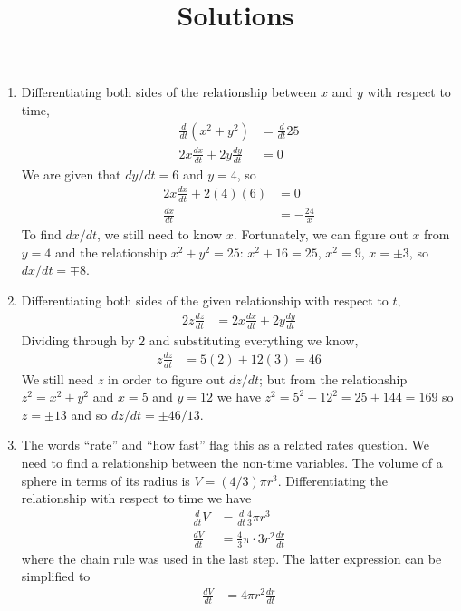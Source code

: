 \documentclass{article}
\title{\commonPSTitleZeroTwoEight\ Solutions}
\author{\commonAuthor}
\date{\commonDateZeroTwoEight}
\begin{document}
\maketitle
\begin{enumerate}
\item %
  Differentiating both sides of the relationship between $x$ and $y$ with
  respect to time,
  \begin{align*}
    \frac{d}{dt}(x^2+y^2) &= \frac{d}{dt} 25
    \\
    2x\frac{dx}{dt} + 2y\frac{dy}{dt} &= 0
  \end{align*}
  We are given that $dy/dt=6$ and $y=4$, so
  \begin{align*}
    2x\frac{dx}{dt} + 2(4)(6) &= 0
    \\
    \frac{dx}{dt} &= -\frac{24}{x}
  \end{align*}
  To find $dx/dt$, we still need to know $x$.  Fortunately, we can figure
  out $x$ from $y=4$ and the relationship $x^2+y^2=25$: $x^2+16=25$, $x^2=9$,
  $x=\pm 3$, so $dx/dt=\mp 8$.
\item %
  Differentiating both sides of the given relationship with respect to
  $t$,
  \begin{align*}
    2z\frac{dz}{dt} &= 2x\frac{dx}{dt}+2y\frac{dy}{dt}
  \end{align*}
  Dividing through by $2$ and substituting everything we know,
  \begin{align*}
    z\frac{dz}{dt} &= 5(2) + 12(3) = 46
  \end{align*}
  We still need $z$ in order to figure out $dz/dt$; but from the relationship
  $z^2=x^2+y^2$ and $x=5$ and $y=12$ we have $z^2=5^2+12^2=25+144=169$ so 
  $z=\pm 13$ and so $dz/dt=\pm 46/13$.
\item %
  The words ``rate'' and ``how fast'' flag this as a related rates
  question.  We need to find a relationship between the non-time variables.
  The volume of a sphere in terms of its radius is $V=(4/3)\pi r^3$.  
  Differentiating the relationship with respect to time we have
  \begin{align*}
    \frac{d}{dt} V &= \frac{d}{dt} \frac{4}{3} \pi r^3 \\
    \frac{dV}{dt} &= \frac{4}{3} \pi \cdot 3r^2 \frac{dr}{dt}
  \end{align*}
  where the chain rule was used in the last step.  The latter expression
  can be simplified to
  \begin{align*}
    \frac{dV}{dt} &= 4\pi r^2 \frac{dr}{dt}
  \end{align*}

\end{enumerate}
\end{document}
